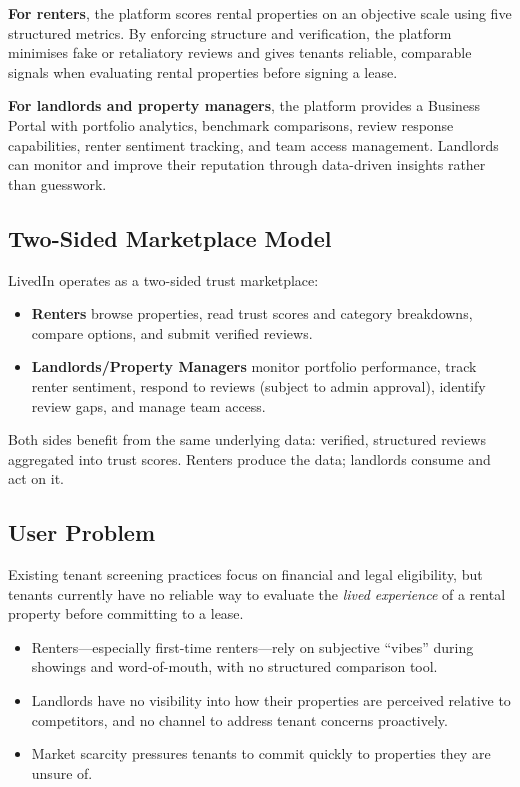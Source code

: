 \documentclass[11pt,letterpaper]{article}
\begin{document}
\textbf{For renters}, the platform scores rental properties on an objective scale using five structured metrics. By enforcing structure and verification, the platform minimises fake or retaliatory reviews and gives tenants reliable, comparable signals when evaluating rental properties before signing a lease.

\textbf{For landlords and property managers}, the platform provides a Business Portal with portfolio analytics, benchmark comparisons, review response capabilities, renter sentiment tracking, and team access management. Landlords can monitor and improve their reputation through data-driven insights rather than guesswork.

\subsection{Two-Sided Marketplace Model}

LivedIn operates as a two-sided trust marketplace:

\begin{itemize}
    \item \textbf{Renters} browse properties, read trust scores and category breakdowns, compare options, and submit verified reviews.
    \item \textbf{Landlords/Property Managers} monitor portfolio performance, track renter sentiment, respond to reviews (subject to admin approval), identify review gaps, and manage team access.
\end{itemize}

Both sides benefit from the same underlying data: verified, structured reviews aggregated into trust scores. Renters produce the data; landlords consume and act on it.

\subsection{User Problem}

Existing tenant screening practices focus on financial and legal eligibility, but tenants currently have no reliable way to evaluate the \emph{lived experience} of a rental property before committing to a lease.

\begin{itemize}
    \item Renters---especially first-time renters---rely on subjective ``vibes'' during showings and word-of-mouth, with no structured comparison tool.
    \item Landlords have no visibility into how their properties are perceived relative to competitors, and no channel to address tenant concerns proactively.
    \item Market scarcity pressures tenants to commit quickly to properties they are unsure of.
\end{itemize}
\end{document}
